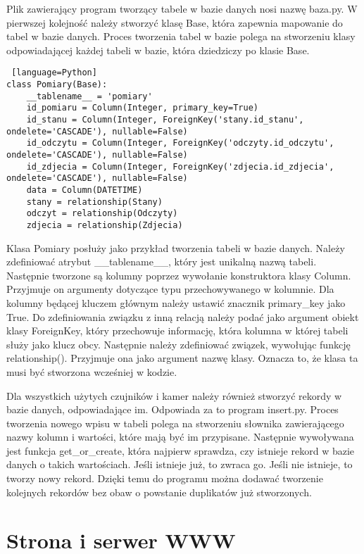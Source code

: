 \documentclass[a4paper,12pt,twoside]{article}
\begin{document}
Plik zawierający program tworzący tabele w bazie danych nosi nazwę baza.py. W pierwszej kolejność należy stworzyć klasę Base, która zapewnia mapowanie do tabel w bazie danych. Proces tworzenia tabel w bazie polega na stworzeniu klasy odpowiadającej każdej tabeli w bazie, która dziedziczy po klasie Base.
\begin{lstlisting} [language=Python]
class Pomiary(Base):
    __tablename__ = 'pomiary'
    id_pomiaru = Column(Integer, primary_key=True)
    id_stanu = Column(Integer, ForeignKey('stany.id_stanu', ondelete='CASCADE'), nullable=False)
    id_odczytu = Column(Integer, ForeignKey('odczyty.id_odczytu', ondelete='CASCADE'), nullable=False)
    id_zdjecia = Column(Integer, ForeignKey('zdjecia.id_zdjecia', ondelete='CASCADE'), nullable=False)
    data = Column(DATETIME)
    stany = relationship(Stany)
    odczyt = relationship(Odczyty)
    zdjecia = relationship(Zdjecia)
\end{lstlisting}
Klasa Pomiary posłuży jako przykład tworzenia tabeli w bazie danych. Należy zdefiniować atrybut {\_\_}tablename{\_\_}, który jest unikalną nazwą tabeli. Następnie tworzone są kolumny poprzez wywołanie konstruktora klasy Column. Przyjmuje on argumenty dotyczące typu przechowywanego w kolumnie. Dla kolumny będącej kluczem głównym należy ustawić znacznik primary{\_}key jako True. Do zdefiniowania związku z inną relacją należy podać jako argument obiekt klasy ForeignKey, który przechowuje informację, która kolumna w której tabeli służy jako klucz obcy. Następnie należy zdefiniować związek, wywołując funkcję relationship(). Przyjmuje ona jako argument nazwę klasy. Oznacza to, że klasa ta musi być stworzona wcześniej w kodzie.

Dla wszystkich użytych czujników i kamer należy również stworzyć rekordy w bazie danych, odpowiadające im. Odpowiada za to program insert.py. Proces tworzenia nowego wpisu w tabeli polega na stworzeniu słownika zawierającego nazwy kolumn i wartości, które mają być im przypisane. Następnie wywoływana jest funkcja get{\_}or{\_}create, która najpierw sprawdza, czy istnieje rekord w bazie danych o takich wartościach. Jeśli istnieje już, to zwraca go. Jeśli nie istnieje, to tworzy nowy rekord. Dzięki temu do programu można dodawać tworzenie kolejnych rekordów bez obaw o powstanie duplikatów już stworzonych.

\section{Strona i serwer WWW}
\end{document}
